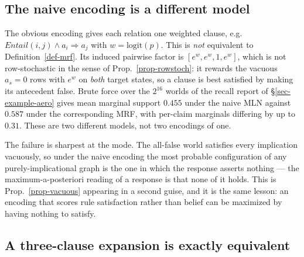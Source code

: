 \subsection{The naive encoding is a different model}

The obvious encoding gives each relation one weighted clause, e.g.\
$\mathit{Entail}(i,j)\wedge a_i \Rightarrow a_j$ with $w=\mathrm{logit}(p)$. This is \emph{not}
equivalent to Definition~\ref{def-mrf}. Its induced pairwise factor is $[e^w,e^w,1,e^w]$, which is not
row-stochastic in the sense of Prop.~\ref{prop-rowstoch}: it rewards the vacuous $a_s=0$ rows with
$e^w$ on \emph{both} target states, so a clause is best satisfied by making its antecedent false.
Brute force over the $2^{16}$ worlds of the recall report of \S\ref{sec-example-aero} gives mean
marginal support $0.455$ under
the naive MLN against $0.587$ under the corresponding MRF, with per-claim marginals differing by up to
$0.31$. These are two different models, not two encodings of one.

The failure is sharpest at the mode. The all-false world satisfies every implication vacuously, so under
the naive encoding the most probable configuration of any purely-implicational graph is the one in which
the response asserts nothing --- the maximum-a-posteriori reading of a response is that none of it
holds. This is Prop.~\ref{prop-vacuous} appearing in a second guise, and it is the same lesson: an
encoding that scores rule satisfaction rather than belief can be maximized by having nothing to satisfy.

\subsection{A three-clause expansion is exactly equivalent}

